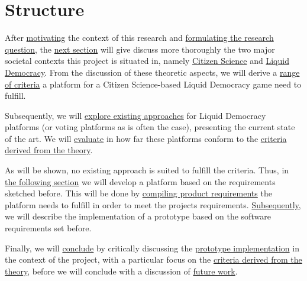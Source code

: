 \section{Structure}
\label{sec:structure}


After \href{ssec:Motivation}{motivating} the context of this research and \href{ssec:Objective}{formulating the research question}, the \href{sec:Theory}{next section} will give discuss more thoroughly the two major societal contexts this project is situated in, namely \href{ssec:Theory_CS}{Citizen Science} and \href{ssec:Theory_LD}{Liquid Democracy}. From the discussion of these theoretic aspects, we will derive a \href{ssec:Criteria}{range of criteria} a platform for a Citizen Science-based Liquid Democracy game need to fulfill.

Subsequently, we will \href{sec:RelatedWork}{explore existing approaches} for Liquid Democracy platforms (or voting platforms as is often the case), presenting the current state of the art. We will \href{ssec:Evaluation}{evaluate} in how far these platforms conform to the \href{ssec:Criteria}{criteria derived from the theory}. 

As will be shown, no existing approach is suited to fulfill the criteria. Thus, in \href{sec:ProjectRequirements}{the following section} we will develop a platform based on the requirements sketched before. This will be done by \href{ssec:SoftwareRequirements}{compiling product requirements} the platform needs to fulfill in order to meet the projects requirements. \href{ssec:Implementation}{Subsequently}, we will describe the implementation of a prototype based on the software requirements set before.

Finally, we will \href{sec:Conclusion}{conclude} by critically discussing the \href{ssec:DiscussionImplementation}{prototype implementation} in the context of the project, with a particular focus on the \href{ssec:Criteria}{criteria derived from the theory}, before we will conclude with a discussion of \href{ssec:FutureWork}{future work}.